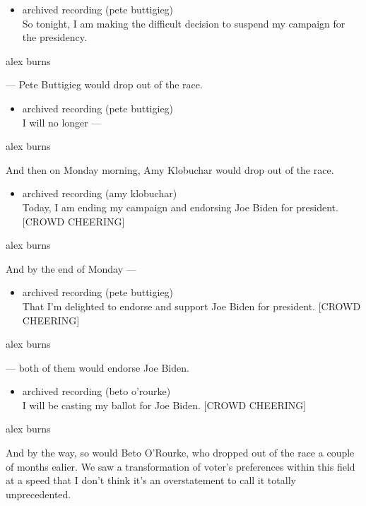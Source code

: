 \begin{itemize}
\tightlist
\item
  archived recording (pete buttigieg)\\
  So tonight, I am making the difficult decision to suspend my campaign
  for the presidency.
\end{itemize}

alex burns

--- Pete Buttigieg would drop out of the race.

\begin{itemize}
\tightlist
\item
  archived recording (pete buttigieg)\\
  I will no longer ---
\end{itemize}

alex burns

And then on Monday morning, Amy Klobuchar would drop out of the race.

\begin{itemize}
\tightlist
\item
  archived recording (amy klobuchar)\\
  Today, I am ending my campaign and endorsing Joe Biden for president.
  {[}CROWD CHEERING{]}
\end{itemize}

alex burns

And by the end of Monday ---

\begin{itemize}
\tightlist
\item
  archived recording (pete buttigieg)\\
  That I'm delighted to endorse and support Joe Biden for president.
  {[}CROWD CHEERING{]}
\end{itemize}

alex burns

--- both of them would endorse Joe Biden.

\begin{itemize}
\tightlist
\item
  archived recording (beto o'rourke)\\
  I will be casting my ballot for Joe Biden. {[}CROWD CHEERING{]}
\end{itemize}

alex burns

And by the way, so would Beto O'Rourke, who dropped out of the race a
couple of months ealier. We saw a transformation of voter's preferences
within this field at a speed that I don't think it's an overstatement to
call it totally unprecedented.

